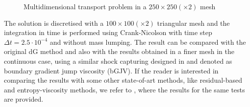 \begin{figure}%
\centering
{}%
\caption{Multidimensional transport problem in a $250\times 250 (\times 2)$ mesh}\label{fig-algo}
\end{figure}


The solution is discretised with a $100 \times 100 (\times 2)$ triangular mesh and the integration in time is performed using Crank-Nicolson with time step $\Delta t = 2.5\cdot 10^{-4}$ and without mass lumping. The result can be compared with the original dG method and also with the results obtained in a finer mesh in the continuous case, using a similar shock capturing designed in \cite{ourpaper} and denoted as boundary gradient jump viscosity (bGJV). { If the reader is interested in comparing the results with some other state-of-art methods, like residual-based and entropy-viscosity methods, we refer to \cite{ourpaper}, where the results for the same tests are provided}. 

